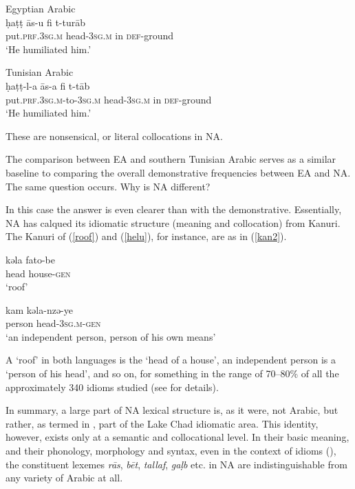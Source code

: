 \documentclass[output=paper]{langsci/langscibook}
\begin{document}
\ea
\ea Egyptian Arabic \\
\gll ḥaṭṭ {\R}ās-u fi t-turāb\\
     put.\textsc{prf.3sg.m} head-\textsc{3sg.m} in \textsc{def}{}-ground\\
\glt ‘He humiliated him.’ \label{egy}

\ex Tunisian Arabic \\
\gll ḥaṭṭ-l-a {\R}ās-a fi t-t{\R}āb\\
     put.\textsc{prf.3sg.m}-to-\textsc{3sg.m} head-\textsc{3sg.m} in \textsc{def}{}-ground\\
\glt ‘He humiliated him.’ \label{tun}
\z
\z

These are nonsensical, or literal collocations in NA.

The comparison between EA and southern Tunisian Arabic serves as a similar baseline to comparing the overall demonstrative frequencies between EA and NA. The same question occurs. Why is NA different? 

In this case the answer is even clearer than with the demonstrative. Essentially, NA has calqued its idiomatic structure (meaning and collocation) from Kanuri. The Kanuri of (\ref{roof}) and (\ref{helu}), for instance, are as in (\ref{kan2}).

\ea\label{kan2}
\ea
\gll kəla fato-be\\
     head house-\textsc{gen}\\
\glt ‘roof’\label{fato}

\ex 
\gll kam kəla-nzə-ye\\
     person head-\textsc{3sg.m}{}-\textsc{gen}\\
\glt ‘an independent person, person of his own means’\label{kam}
\z
\z

A ‘roof’ in both languages is the ‘head of a house’, an independent person is a ‘person of his head’, and so on, for something in the range of 70–80\% of all the approximately 340 idioms studied (see \citealt{Owens1996,Owens2014,Owens2015,Owens2016idioms} for details).

In summary, a large part of NA lexical structure is, as it were, not Arabic, but rather, as termed in \citet{Owens1998}, part of the Lake Chad idiomatic area. This identity, however, exists only at a semantic and collocational level. In their basic meaning, and their phonology, morphology and syntax, even in the context of idioms (\citealt{OwensDodsworth2017}), the constituent lexemes \textit{rās}, \textit{bēt}, \textit{tallaf}, \textit{gaḷb} etc. in NA are indistinguishable from any variety of Arabic at all. 
\end{document}
